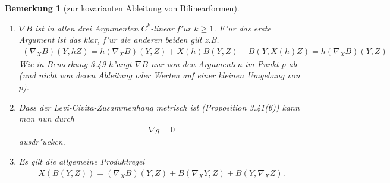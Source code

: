 \documentclass[10pt,a4paper]{article}
\newcommand{\fc}[1]{\special{fc=#1}}
\newtheorem{bem}[sat]{Bemerkung}
\begin{document}
\fc{Bzkovabl}
\begin{bem}[zur kovarianten Ableitung von Bilinearformen]
\begin{enumerate}
\item $\nabla B$ ist in allen drei Argumenten $C^k$-linear f"ur $k\geq1$. F"ur das erste Argument ist das klar, f"ur die anderen beiden gilt z.B.
\begin{align*}
(\nabla_X B)(Y,hZ) = h(\nabla_X B)(Y,Z) + X(h)B(Y,Z) - B(Y,X(h)Z)= h(\nabla_X B)(Y,Z)
\end{align*}
Wie in Bemerkung 3.49 h"angt $\nabla B$ nur von den Argumenten im Punkt $p$ ab (und nicht von deren Ableitung oder Werten auf einer kleinen Umgebung von $p$).
\item Dass der Levi-Civita-Zusammenhang metrisch ist (Proposition 3.41(6)) kann man nun durch
\begin{align*}
 \nabla g = 0
\end{align*}
ausdr"ucken.
\item
Es gilt die allgemeine Produktregel
\begin{align*}
 X(B(Y,Z)) = (\nabla_X B)(Y,Z) + B(\nabla_X Y,Z) + B(Y,\nabla_X Z).
\end{align*}
\end{enumerate}







\end{bem}
\end{document}
